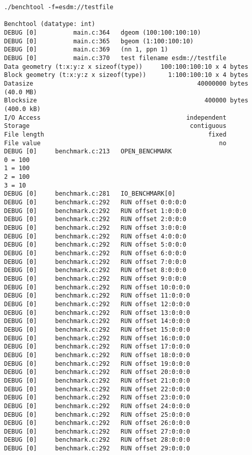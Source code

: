 \begin{verbatim}
./benchtool -f=esdm://testfile

Benchtool (datatype: int)
DEBUG [0]          main.c:364   dgeom (100:100:100:10)
DEBUG [0]          main.c:365   bgeom (1:100:100:10)
DEBUG [0]          main.c:369   (nn 1, ppn 1)
DEBUG [0]          main.c:370   test filename esdm://testfile
Data geometry (t:x:y:z x sizeof(type))     100:100:100:10 x 4 bytes
Block geometry (t:x:y:z x sizeof(type))      1:100:100:10 x 4 bytes
Datasize                                             40000000 bytes                (40.0 MB)
Blocksize                                              400000 bytes                (400.0 kB)
I/O Access                                        independent
Storage                                            contiguous
File length                                             fixed
File value                                                 no
DEBUG [0]     benchmark.c:213   OPEN_BENCHMARK
0 = 100
1 = 100
2 = 100
3 = 10
DEBUG [0]     benchmark.c:281   IO_BENCHMARK[0]
DEBUG [0]     benchmark.c:292   RUN offset 0:0:0:0
DEBUG [0]     benchmark.c:292   RUN offset 1:0:0:0
DEBUG [0]     benchmark.c:292   RUN offset 2:0:0:0
DEBUG [0]     benchmark.c:292   RUN offset 3:0:0:0
DEBUG [0]     benchmark.c:292   RUN offset 4:0:0:0
DEBUG [0]     benchmark.c:292   RUN offset 5:0:0:0
DEBUG [0]     benchmark.c:292   RUN offset 6:0:0:0
DEBUG [0]     benchmark.c:292   RUN offset 7:0:0:0
DEBUG [0]     benchmark.c:292   RUN offset 8:0:0:0
DEBUG [0]     benchmark.c:292   RUN offset 9:0:0:0
DEBUG [0]     benchmark.c:292   RUN offset 10:0:0:0
DEBUG [0]     benchmark.c:292   RUN offset 11:0:0:0
DEBUG [0]     benchmark.c:292   RUN offset 12:0:0:0
DEBUG [0]     benchmark.c:292   RUN offset 13:0:0:0
DEBUG [0]     benchmark.c:292   RUN offset 14:0:0:0
DEBUG [0]     benchmark.c:292   RUN offset 15:0:0:0
DEBUG [0]     benchmark.c:292   RUN offset 16:0:0:0
DEBUG [0]     benchmark.c:292   RUN offset 17:0:0:0
DEBUG [0]     benchmark.c:292   RUN offset 18:0:0:0
DEBUG [0]     benchmark.c:292   RUN offset 19:0:0:0
DEBUG [0]     benchmark.c:292   RUN offset 20:0:0:0
DEBUG [0]     benchmark.c:292   RUN offset 21:0:0:0
DEBUG [0]     benchmark.c:292   RUN offset 22:0:0:0
DEBUG [0]     benchmark.c:292   RUN offset 23:0:0:0
DEBUG [0]     benchmark.c:292   RUN offset 24:0:0:0
DEBUG [0]     benchmark.c:292   RUN offset 25:0:0:0
DEBUG [0]     benchmark.c:292   RUN offset 26:0:0:0
DEBUG [0]     benchmark.c:292   RUN offset 27:0:0:0
DEBUG [0]     benchmark.c:292   RUN offset 28:0:0:0
DEBUG [0]     benchmark.c:292   RUN offset 29:0:0:0

\end{verbatim}
